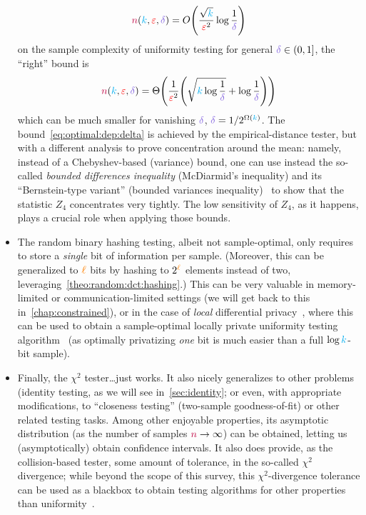 \begin{itemize}
  \begin{equation}
      \ns(\ab,\dst,\errprob) = \bigO{\frac{\sqrt{\ab}}{\dst^2}\log\frac{1}{\errprob}}
  \end{equation}
  on the sample complexity of uniformity testing for general $\errprob\in(0,1]$, the ``right'' bound is
  \begin{equation}
    \label{eq:optimal:dep:delta}
  \ns(\ab,\dst,\errprob) = \bigTheta{\frac{1}{\dst^2}\Paren{\sqrt{\ab\log\frac{1}{\errprob}}+\log\frac{1}{\errprob}}}
  \end{equation}
  which can be much smaller for vanishing $\errprob$, \eg $\errprob = 1/2^{\Omega(\ab)}$. The bound~\cref{eq:optimal:dep:delta} is achieved by the empirical-distance tester, but with a different analysis to prove concentration around the mean: namely, instead of a Chebyshev-based (variance) bound, one can use instead the so-called \emph{bounded differences inequality} (McDiarmid's inequality) and its ``Bernstein-type variant'' (bounded variances inequality)~\citep[Chapters~5.4 and 8]{DubhashiP09} to show that the statistic $Z_4$ concentrates very tightly. The low sensitivity of $Z_4$, as it happens, plays a crucial role when applying those bounds.
  \item The random binary hashing testing, albeit not sample-optimal, only requires to store a \emph{single} bit of information per sample. (Moreover, this can be generalized to ${\textcolor{orange}{\ell}}$ bits by hashing to $2^{\textcolor{orange}{\ell}}$ elements instead of two, leveraging~\cref{theo:random:dct:hashing}.) This can be very valuable in memory-limited or communication-limited settings (we will get back to this in~\cref{chap:constrained}), or in the case of \emph{local} differential privacy~\citep{KLNRS:11}, where this can be used to obtain a sample-optimal locally private uniformity testing algorithm~\citep{AcharyaCFST21} (as optimally privatizing \emph{one} bit is much easier than a full $\log{\textcolor{cyan}{k}}$-bit sample).
  \item Finally, the $\chi^2$ tester\dots just works. It also nicely generalizes to other problems (identity testing, as we will see in~\cref{sec:identity}; or even, with appropriate modifications, to ``closeness testing'' (two-sample goodness-of-fit) or other related testing tasks. Among other enjoyable properties, its asymptotic distribution (as the number of samples ${\textcolor{purple}{n}}\to\infty$) can be obtained, letting us (asymptotically) obtain confidence intervals. It also does provide, as the collision-based tester, some amount of tolerance, in the so-called $\chi^2$ divergence; while beyond the scope of this survey, this $\chi^2$-divergence tolerance can be used as a blackbox to obtain testing algorithms for other properties than uniformity~\citep{AcharyaDK15}.
\end{itemize}

